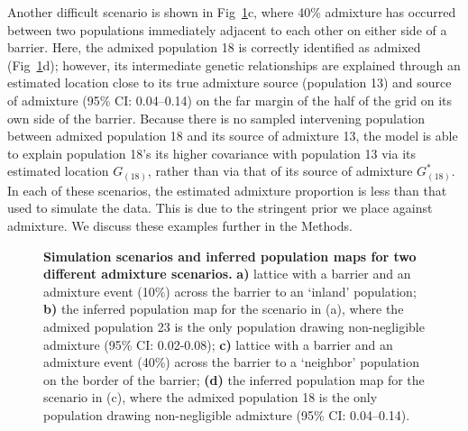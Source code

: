 \documentclass[10pt,letterpaper]{article}
\newcommand{\kadmixsource}[1]{{$G^{*}_{#1}$}}
\begin{document}
Another difficult scenario is shown in Fig\ \ref{sfig:barr_inland_ad}c,
where 40\% admixture has occurred between two populations immediately adjacent to each other on either side of a barrier.  
Here, the admixed population 18 is correctly identified as admixed (Fig\ \ref{sfig:barr_inland_ad}d); 
however, its intermediate genetic relationships are explained through an estimated location close to its true admixture source (population 13)
and source of admixture (95\% CI: 0.04--0.14) on the far margin of the half of the grid on its own side of the barrier.
Because there is no sampled intervening population between admixed population 18 and its source of admixture 13, 
the model is able to explain population 18's its higher covariance with population 13 via its estimated location $G_{(18)}$, 
rather than via that of its source of admixture \kadmixsource{(18)}.  
In each of these scenarios, the estimated admixture proportion is less than that used to simulate the data.  This is due to the stringent prior we place against admixture.  We discuss these examples further in the Methods.
%
\begin{figure}[ht!]
\begin{center}
\end{center}
\caption{
\textbf{Simulation scenarios and inferred population maps for two different admixture scenarios.}
	\textbf{a)} 
	lattice with a barrier and an admixture event (10\%) across the barrier to an `inland' population; 
	\textbf{b)}
	the inferred population map for the scenario in (a),
	where the admixed population 23 is the only population drawing 
	non-negligible admixture (95\% CI: 0.02-0.08); 
	\textbf{c)} lattice with a barrier and an admixture event (40\%) across the barrier
	 to a `neighbor' population on the border of the barrier; 
	 \textbf{(d)} the inferred population map for the scenario in (c), 
	 where the admixed population 18 is the only population drawing 
	 non-negligible admixture (95\% CI: 0.04--0.14).
}\label{sfig:barr_inland_ad}
\end{figure}
\end{document}
